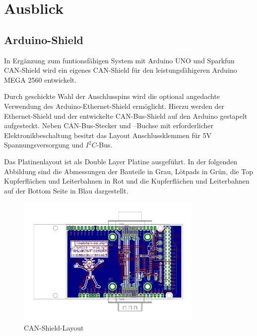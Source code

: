 
\section{Ausblick}
\label{sec:Ausblick}

\subsection{Arduino-Shield}
\label{sec:Arduino-Shield}
In Ergänzung zum funtionsfähigen System mit Arduino UNO und Sparkfun CAN-Shield wird ein eigenes CAN-Shield für den leistungsfähigeren Arduino MEGA 2560 entwickelt.
 
Durch geschickte Wahl der Anschlusspins wird die optional angedachte Verwendung des Arduino-Ethernet-Shield ermöglicht. Hierzu werden der Ethernet-Shield und der entwickelte CAN-Bus-Shield auf den Arduino gestapelt aufgesteckt. Neben CAN-Bus-Stecker und –Buchse mit erforderlicher Elektronikbeschaltung besitzt das Layout Anschlussklemmen für 5V Spannungsversorgung und $I^{2}C$-Bus.

Das Platinenlayout ist als Double Layer Platine ausgeführt. In der folgenden Abbildung
sind die Abmessungen der Bauteile  in Grau, Lötpads in Grün, die Top Kupferflächen und Leiterbahnen in Rot und die Kupferflächen  und Leiterbahnen auf der Bottom Seite in Blau dargestellt.

\begin{figure}[H]
\centering
 \includegraphics[width=0.8\textwidth]{Abbildungen/CAN-Shield-Layout} 
\caption[CAN-Shield-Layout]{CAN-Shield-Layout}
\label{fig:CAN-Shield-Layout}
\end{figure}

